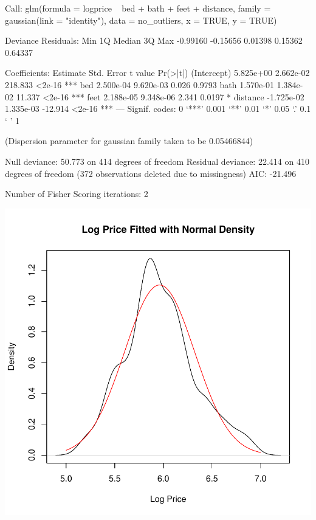 \documentclass[11pt, a4paper]{article}
\begin{document}
\begin{Schunk}
\begin{Soutput}
Call:
glm(formula = logprice ~ bed + bath + feet + distance, family = gaussian(link = "identity"), 
    data = no_outliers, x = TRUE, y = TRUE)

Deviance Residuals: 
     Min        1Q    Median        3Q       Max  
-0.99160  -0.15656   0.01398   0.15362   0.64337  

Coefficients:
              Estimate Std. Error t value Pr(>|t|)    
(Intercept)  5.825e+00  2.662e-02 218.833   <2e-16 ***
bed          2.500e-04  9.620e-03   0.026   0.9793    
bath         1.570e-01  1.384e-02  11.337   <2e-16 ***
feet         2.188e-05  9.348e-06   2.341   0.0197 *  
distance    -1.725e-02  1.335e-03 -12.914   <2e-16 ***
---
Signif. codes:  0 ‘***’ 0.001 ‘**’ 0.01 ‘*’ 0.05 ‘.’ 0.1 ‘ ’ 1

(Dispersion parameter for gaussian family taken to be 0.05466844)

    Null deviance: 50.773  on 414  degrees of freedom
Residual deviance: 22.414  on 410  degrees of freedom
  (372 observations deleted due to missingness)
AIC: -21.496

Number of Fisher Scoring iterations: 2
\end{Soutput}
\end{Schunk}
\includegraphics{project_report-006}
\end{document}
